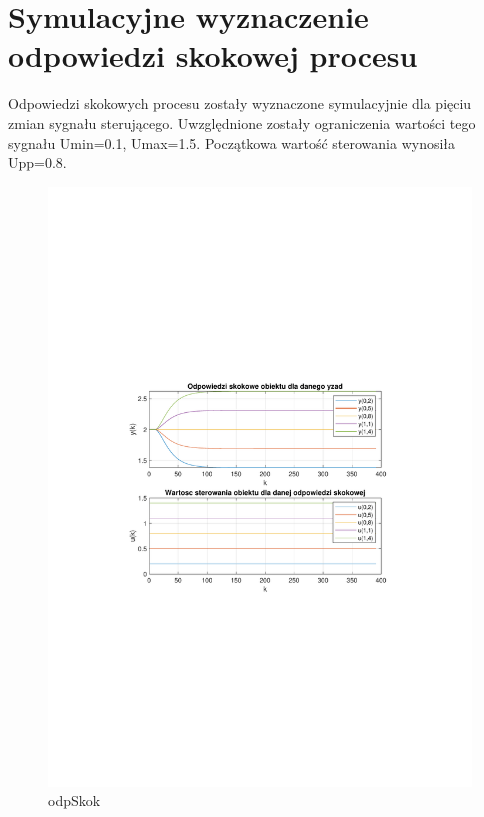 \section{Symulacyjne wyznaczenie odpowiedzi skokowej procesu}

Odpowiedzi skokowych procesu zostały wyznaczone symulacyjnie dla pięciu zmian sygnału sterującego. 
Uwzględnione zostały ograniczenia wartości tego sygnału Umin=0.1, Umax=1.5. 
Początkowa wartość sterowania wynosiła Upp=0.8.

\begin{figure}[H]
    \centering
    \includegraphics[scale=0.8]{../projekt/zad2/Dane/odp_skok.pdf}
    \caption{ odpSkok }
\end{figure}

